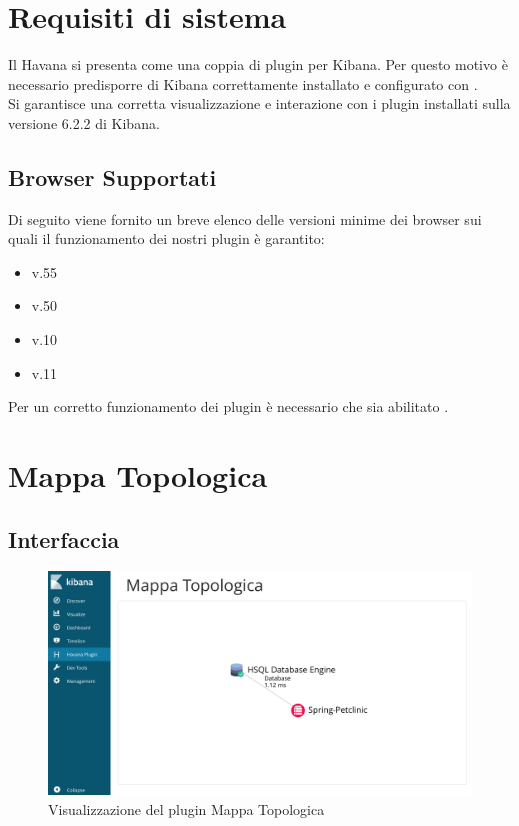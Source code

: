 \newpage
\section{Requisiti di sistema}
Il  Havana si presenta come una coppia di plugin per Kibana. Per questo motivo è necessario predisporre di Kibana correttamente installato e configurato con .
\\ Si garantisce una corretta visualizzazione e interazione con i plugin installati sulla versione 6.2.2 di Kibana.
\subsection{Browser Supportati}

Di seguito viene fornito un breve elenco delle versioni minime dei browser sui quali il funzionamento dei nostri plugin è garantito:
\begin{itemize}
	
	\item {} v.55
	\item {} v.50
	\item {} v.10
	\item {} v.11
	
\end{itemize}

Per un corretto funzionamento dei plugin è necessario che sia abilitato .

\newpage
\section{Mappa Topologica}
\label{sec:mtopologica}
\subsection{Interfaccia}

\begin{figure}[H]
	\centering 
	\includegraphics[width=1\textwidth]{Images/mappa}
	\caption{Visualizzazione del plugin Mappa Topologica}
\end{figure}

